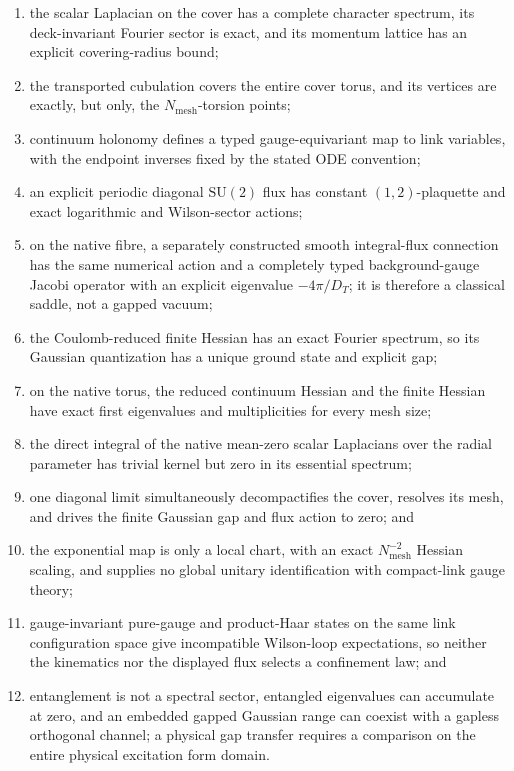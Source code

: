\documentclass[11pt]{article}
\theoremstyle{definition}
\numberwithin{equation}{section}
\begin{document}
\begin{enumerate}
\item the scalar Laplacian on the cover has a complete character spectrum,
its deck-invariant Fourier sector is exact, and its momentum lattice has an
explicit covering-radius bound;
\item the transported cubulation covers the entire cover torus, and its
vertices are exactly, but only, the \(N_{\mathrm{mesh}}\)-torsion points;
\item continuum holonomy defines a typed gauge-equivariant map to link
variables, with the endpoint inverses fixed by the stated ODE convention;
\item an explicit periodic diagonal \(\mathrm{SU}(2)\) flux has constant
\((1,2)\)-plaquette and exact logarithmic and Wilson-sector actions;
\item on the native fibre, a separately constructed smooth integral-flux
connection has the same numerical action and a completely typed
background-gauge Jacobi operator with an explicit eigenvalue
\(-4\pi/D_T\); it is therefore a classical saddle, not a gapped vacuum;
\item the Coulomb-reduced finite Hessian has an exact Fourier spectrum, so
its Gaussian quantization has a unique ground state and explicit gap;
\item on the native torus, the reduced continuum Hessian and the finite
Hessian have exact first eigenvalues and multiplicities for every mesh size;
\item the direct integral of the native mean-zero scalar Laplacians over the
radial parameter has trivial kernel but zero in its essential spectrum;
\item one diagonal limit simultaneously decompactifies the cover, resolves
its mesh, and drives the finite Gaussian gap and flux action to zero; and
\item the exponential map is only a local chart, with an exact
\(N_{\mathrm{mesh}}^{-2}\) Hessian scaling, and supplies no global unitary
identification with compact-link gauge theory;
\item gauge-invariant pure-gauge and product-Haar states on the same link
configuration space give incompatible Wilson-loop expectations, so neither
the kinematics nor the displayed flux selects a confinement law; and
\item entanglement is not a spectral sector, entangled eigenvalues can
accumulate at zero, and an embedded gapped Gaussian range can coexist with a
gapless orthogonal channel; a physical gap transfer requires a comparison on
the entire physical excitation form domain.
\end{enumerate}
\end{document}
